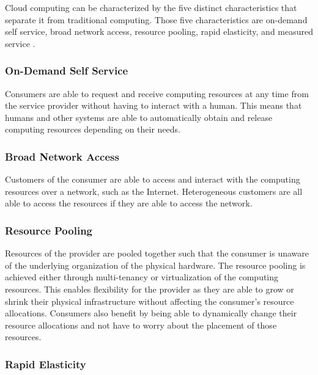 \documentclass[12pt]{article}
\begin{document}
Cloud computing can be characterized by the five distinct characteristics that separate it from traditional computing. Those five characteristics are on-demand self service, broad network access, resource pooling, rapid elasticity, and measured service \cite{alam2015comprehensive, dillon2010cloud}.

\subsubsection{On-Demand Self Service} \label{ssub:on-demand}

Consumers are able to request and receive computing resources at any time from the service provider without having to interact with a human. This means that humans and other systems are able to automatically obtain and release computing resources depending on their needs.


\subsubsection{Broad Network Access} \label{ssub:net-access}

Customers of the consumer are able to access and interact with the computing resources over a network, such as the Internet. Heterogeneous customers are all able to access the resources if they are able to access the network.


\subsubsection{Resource Pooling} \label{ssub:resource-pooling}

Resources of the provider are pooled together such that the consumer is unaware of the underlying organization of the physical hardware. The resource pooling is achieved either through multi-tenancy or virtualization of the computing resources. This enables flexibility for the provider as they are able to grow or shrink their physical infrastructure without affecting the consumer's resource allocations. Consumers also benefit by being able to dynamically change their resource allocations and not have to worry about the placement of those resources.


\subsubsection{Rapid Elasticity} \label{ssub:elasticity}
\end{document}
